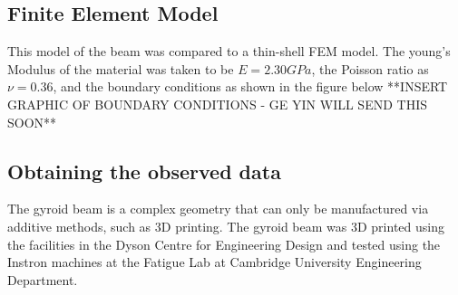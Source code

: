 \documentclass{article}
\begin{document}
\subsection{Finite Element Model}
This model of the beam was compared to a thin-shell FEM model. The young’s Modulus of the material was taken to be $E = 2.30GPa$, the Poisson ratio as $\nu = 0.36$, and the boundary conditions as shown in the figure below **INSERT GRAPHIC OF BOUNDARY CONDITIONS - GE YIN WILL SEND THIS SOON**

\subsection{Obtaining the observed data}
The gyroid beam is a complex geometry that can only be manufactured via additive methods, such as 3D printing. The gyroid beam was 3D printed using the facilities in the Dyson Centre for Engineering Design and tested using the Instron machines at the Fatigue Lab at Cambridge University Engineering Department.
\end{document}
